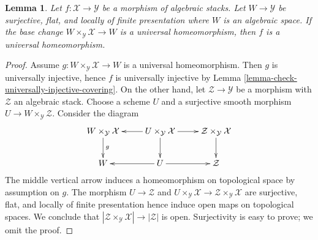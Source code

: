\documentclass[10pt,a4paper]{amsart}
\theoremstyle{plain}
\newtheorem{lemma}[subsection]{Lemma}
\theoremstyle{definition}
\theoremstyle{remark}
\numberwithin{equation}{subsection}
\begin{document}
\begin{lemma}
\label{lemma-check-universal-homeomorphism-covering}
Let $f : \mathcal{X} \to \mathcal{Y}$ be a morphism of algebraic stacks.
Let $W \to \mathcal{Y}$ be surjective, flat, and locally of finite
presentation where $W$ is an algebraic space. If the base change
$W \times_\mathcal{Y} \mathcal{X} \to W$ is a universal homeomorphism,
then $f$ is a universal homeomorphism.
\end{lemma}

\begin{proof}
Assume $g : W \times_\mathcal{Y} \mathcal{X} \to W$ is a universal
homeomorphism. Then $g$ is universally injective, hence $f$ is
universally injective by
Lemma \ref{lemma-check-universally-injective-covering}.
On the other hand, let $\mathcal{Z} \to \mathcal{Y}$
be a morphism with $\mathcal{Z}$ an algebraic stack.
Choose a scheme $U$ and a surjective
smooth morphism $U \to W \times_\mathcal{Y} \mathcal{Z}$.
Consider the diagram
$$
\xymatrix{
W \times_\mathcal{Y} \mathcal{X} \ar[d]^g &
U \times_\mathcal{Y} \mathcal{X} \ar[d] \ar[l] \ar[r] &
\mathcal{Z} \times_\mathcal{Y} \mathcal{X} \ar[d] \\
W &
U \ar[l] \ar[r] &
\mathcal{Z}
}
$$
The middle vertical arrow induces a homeomorphism
on topological space by assumption on $g$.
The morphism $U \to \mathcal{Z}$ and
$U \times_\mathcal{Y} \mathcal{X} \to
\mathcal{Z} \times_\mathcal{Y} \mathcal{X}$
are surjective, flat, and locally of finite presentation
hence induce open maps on topological spaces.
We conclude that
$|\mathcal{Z} \times_\mathcal{Y} \mathcal{X}| \to |\mathcal{Z}|$
is open. Surjectivity is easy to prove; we omit the proof.
\end{proof}
\end{document}
